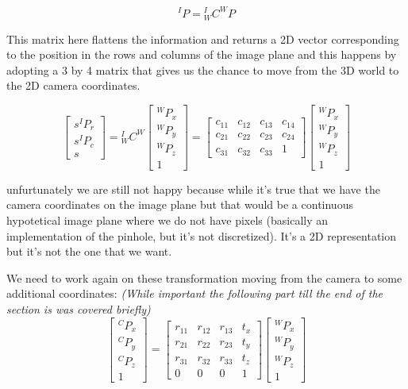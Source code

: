 \[
    {}^IP = {}^I_W C^WP
\]

This matrix here flattens the information and returns a 2D vector corresponding to the position in the rows and columns of the image plane and this happens by adopting a 3 by 4 matrix that gives us the chance to move from the 3D world to the 2D camera coordinates.

\[
    \begin{bmatrix}
        s^IP_r \\
        s^IP_c \\
        s
    \end{bmatrix}
    =
    {}^I_W C^W
    \begin{bmatrix}
        {}^WP_x \\
        {}^WP_y \\
        {}^WP_z \\
        1
    \end{bmatrix}  
    = 
    \begin{bmatrix}
        c_{11} & c_{12} & c_{13} & c_{14} \\
        c_{21} & c_{22} & c_{23} & c_{24} \\
        c_{31} & c_{32} & c_{33} & 1
    \end{bmatrix}
    \begin{bmatrix}
        {}^WP_x \\
        {}^WP_y \\
        {}^WP_z \\
        1
    \end{bmatrix}
\]

unfurtunately we are still not happy because while it's true that we have the camera coordinates on the image plane but that would be a continuous hypotetical image plane where we do not have pixels (basically an implementation of the pinhole, but it's not discretized). It's a 2D representation but it's not the one that we want.

We need to work again on these transformation moving from the camera to some additional coordinates:
\textit{(While important the following part till the end of the section is was covered briefly)}
\[
    \begin{bmatrix}
        {}^CP_x \\
        {}^CP_y \\
        {}^CP_z \\
        1
    \end{bmatrix}
    =
    \begin{bmatrix}
       r_{11} & r_{12} & r_{13} & t_x \\
       r_{21} & r_{22} & r_{23} & t_y \\
       r_{31} & r_{32} & r_{33} & t_z \\
        0 & 0 & 0 & 1
    \end{bmatrix}
    \begin{bmatrix}
        {}^WP_x \\
        {}^WP_y \\
        {}^WP_z \\
        1
    \end{bmatrix}   
\]

